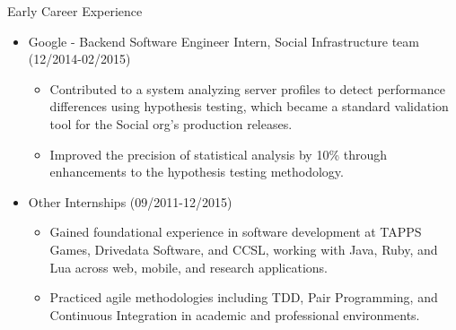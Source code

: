 
\normalsize{Early Career Experience}
\begin{itemize}
    \item \footnotesize{Google - Backend Software Engineer Intern, Social Infrastructure team
        (12/2014-02/2015)}
    \begin{itemize}
        \item \scriptsize{Contributed to a system analyzing server profiles to detect performance 
            differences using hypothesis testing, which became a standard validation tool for the Social 
            org's production releases.}
        \item \scriptsize{Improved the precision of statistical analysis by 10\% through enhancements to 
            the hypothesis testing methodology.}
    \end{itemize}

    \item \footnotesize{Other Internships (09/2011-12/2015)}
    \begin{itemize}
        \item \scriptsize{Gained foundational experience in software development at TAPPS Games, 
            Drivedata Software, and CCSL, working with Java, Ruby, and Lua across web, mobile, and 
            research applications.}
        \item \scriptsize{Practiced agile methodologies including TDD, Pair Programming, and Continuous 
            Integration in academic and professional environments.}
    \end{itemize}
\end{itemize}